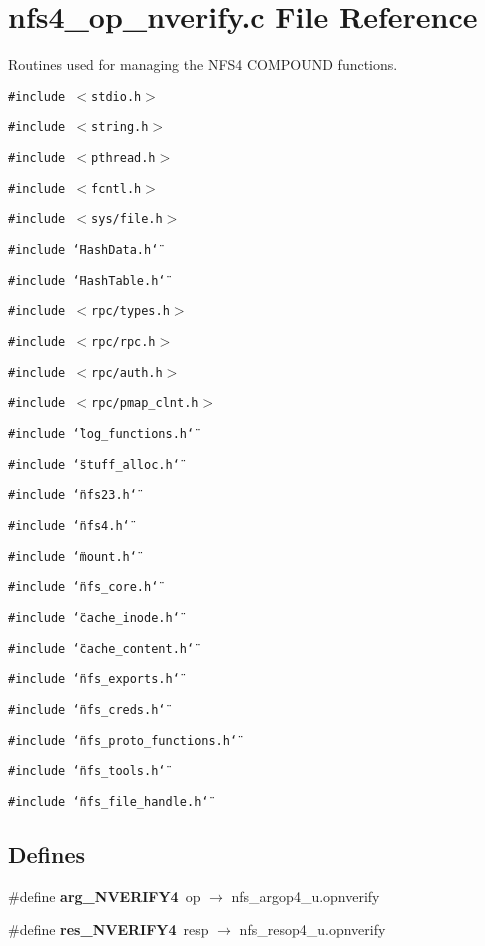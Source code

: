 \section{nfs4\_\-op\_\-nverify.c File Reference}
\label{nfs4__op__nverify_8c}
Routines used for managing the NFS4 COMPOUND functions. 

{\tt \#include $<$stdio.h$>$}\par
{\tt \#include $<$string.h$>$}\par
{\tt \#include $<$pthread.h$>$}\par
{\tt \#include $<$fcntl.h$>$}\par
{\tt \#include $<$sys/file.h$>$}\par
{\tt \#include \char`\"{}Hash\-Data.h\char`\"{}}\par
{\tt \#include \char`\"{}Hash\-Table.h\char`\"{}}\par
{\tt \#include $<$rpc/types.h$>$}\par
{\tt \#include $<$rpc/rpc.h$>$}\par
{\tt \#include $<$rpc/auth.h$>$}\par
{\tt \#include $<$rpc/pmap\_\-clnt.h$>$}\par
{\tt \#include \char`\"{}log\_\-functions.h\char`\"{}}\par
{\tt \#include \char`\"{}stuff\_\-alloc.h\char`\"{}}\par
{\tt \#include \char`\"{}nfs23.h\char`\"{}}\par
{\tt \#include \char`\"{}nfs4.h\char`\"{}}\par
{\tt \#include \char`\"{}mount.h\char`\"{}}\par
{\tt \#include \char`\"{}nfs\_\-core.h\char`\"{}}\par
{\tt \#include \char`\"{}cache\_\-inode.h\char`\"{}}\par
{\tt \#include \char`\"{}cache\_\-content.h\char`\"{}}\par
{\tt \#include \char`\"{}nfs\_\-exports.h\char`\"{}}\par
{\tt \#include \char`\"{}nfs\_\-creds.h\char`\"{}}\par
{\tt \#include \char`\"{}nfs\_\-proto\_\-functions.h\char`\"{}}\par
{\tt \#include \char`\"{}nfs\_\-tools.h\char`\"{}}\par
{\tt \#include \char`\"{}nfs\_\-file\_\-handle.h\char`\"{}}\par
\subsection*{Defines}
\begin{CompactItemize}
\item 
\#define {\bf arg\_\-NVERIFY4}\ op $\rightarrow$ nfs\_\-argop4\_\-u.opnverify
\item 
\#define {\bf res\_\-NVERIFY4}\ resp $\rightarrow$ nfs\_\-resop4\_\-u.opnverify
\end{CompactItemize}
